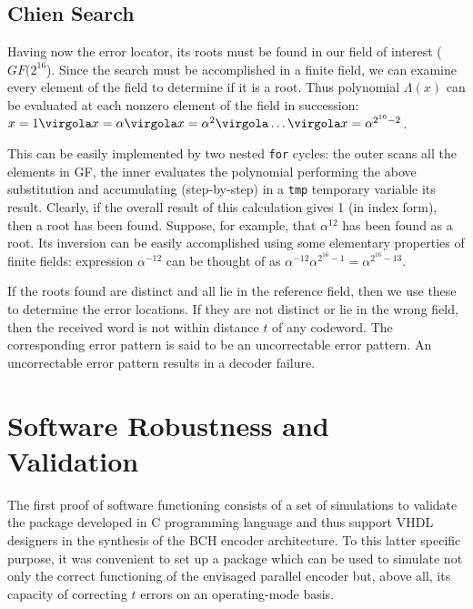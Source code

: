 \subsection{Chien Search}

Having now the error locator, its roots must be found in our field of interest (\(GF(2^{16}\)). Since the search must be accomplished in a finite field, we can examine every element of the field to determine if it is a root. Thus polynomial \(\Lambda(x)\) can be evaluated at each nonzero element of the field in succession: \(x=1 \virgola x= \alpha \virgola x = \alpha^2 \virgola \ldots \virgola x= \alpha^{2^{16}-2} \).

This can be easily implemented by two nested \texttt{for} cycles: the outer scans all the elements in GF, the inner evaluates the polynomial performing the above substitution and accumulating (step-by-step) in a \texttt{tmp} temporary variable its result. Clearly, if the overall result of this calculation gives 1 (in index form), then a root has been found. Suppose, for example, that \(\alpha^{12}\) has been found as a root. Its inversion can be easily accomplished using some elementary properties of finite fields: expression \(\alpha^{-12}\) can be thought of as \(\alpha^{-12}\alpha^{2^{16}-1} = \alpha^{2^{16}-13}\).

If the roots found are distinct and all lie in the reference field, then we use these to determine the error locations. If they are not distinct or lie in the wrong field, then the received word is not within distance \(t\) of any codeword. The corresponding error pattern is said to be an uncorrectable error pattern. An uncorrectable error pattern results in a decoder failure.

\section{Software Robustness and Validation}

The first proof of software functioning consists of a set of simulations to validate the package developed in C programming language and thus support VHDL designers in the synthesis of the BCH encoder architecture. To this latter specific purpose, it was convenient to set up a package which can be used to simulate not only the correct functioning of the envisaged parallel encoder but, above all, its capacity of correcting \(t\) errors on an operating-mode basis.

